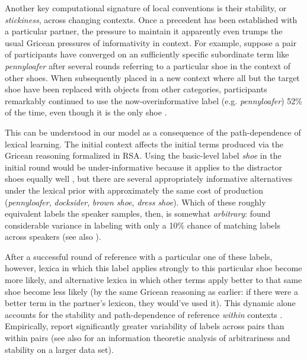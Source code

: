 Another key computational signature of local conventions is their stability, or \emph{stickiness}, across changing contexts. Once a precedent has been established with a particular partner, the pressure to maintain it apparently even trumps the usual Gricean pressures of informativity in context. For example, suppose a pair of participants have converged on an sufficiently specific subordinate term like \emph{pennyloafer} after several rounds referring to a particular shoe in the context of other shoes. %
When subsequently placed in a new context where all but the target shoe have been replaced with objects from other categories, participants remarkably continued to use the now-overinformative label (e.g. \emph{pennyloafer}) 52\% of the time, even though it is the only shoe \cite{BrennanClark96_ConceptualPactsConversation}.

This can be understood in our model as a consequence of the path-dependence of lexical learning. The initial context affects the initial terms produced via the Gricean reasoning formalized in RSA. Using the basic-level label \emph{shoe} in the initial round would be under-informative because it applies to the distractor shoes equally well \cite{GrafEtAl16_BasicLevel}, but there are several appropriately informative alternatives under the lexical prior with approximately the same cost of production (\emph{pennyloafer}, \emph{docksider}, \emph{brown shoe}, \emph{dress shoe}). Which of these roughly equivalent labels the speaker samples, then, is somewhat \emph{arbitrary}:  found considerable variance in labeling with only a 10\% chance of matching labels across speakers (see also ). 

After a successful round of reference with a particular one of these labels, however, lexica in which this label applies strongly to this particular shoe become more likely, and alternative lexica in which other terms apply better to that same shoe become less likely (by the same Gricean reasoning as earlier: if there were a better term in the partner's lexicon, they would've used it). This dynamic alone accounts for the stability and path-dependence of reference \emph{within} contexts \cite{HawkinsFrankGoodman17_ConventionFormation}. Empirically,  report significantly greater variability of labels across pairs than within pairs (see also  for an information theoretic analysis of arbitrariness and stability on a larger data set). 

